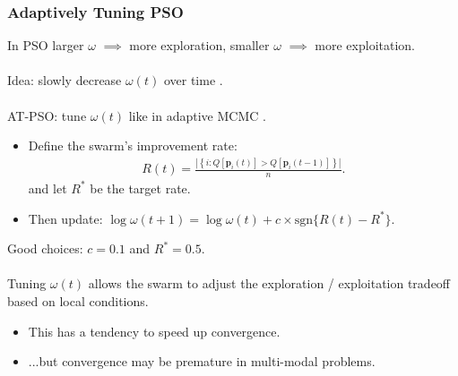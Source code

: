 \documentclass[xcolor=dvipsnames]{beamer}
\begin{document}
\begin{frame}
\frametitle{Adaptively Tuning PSO}
In PSO larger $\omega$ $\implies$ more exploration, smaller $\omega$ $\implies$ more exploitation.\\~\\

Idea: slowly decrease $\omega(t)$ over time \citep{eberhart2000comparing}.\\~\\

 AT-PSO: tune $\omega(t)$ like in adaptive MCMC \citep{andrieu2008tutorial}.
\begin{itemize}
\item Define the swarm's improvement rate:
\begin{align*}
R(t) = \frac{\left|\left\{i:Q[\bm{p}_i(t)] > Q[\bm{p}_i(t-1)]\right\}\right|}{n}.
\end{align*}
and let $R^*$ be the target rate.
\item Then update: $\log\omega(t+1) = \log\omega(t) + c\times\mbox{sgn}\{R(t) - R^*\}$.
\end{itemize}
Good choices: $c=0.1$ and $R^*=0.5$.\\~\\

 Tuning $\omega(t)$ allows the swarm to adjust the exploration / exploitation tradeoff based on local conditions.
\begin{itemize}
\item This has a tendency to speed up convergence.
\item ...but convergence may be premature in multi-modal problems.
\end{itemize}
\end{frame}

\end{document}
